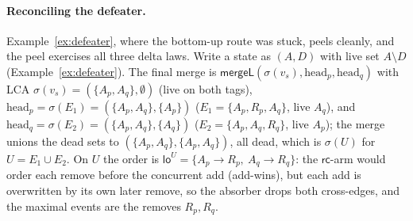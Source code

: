 \documentclass[11pt]{article}
\newcommand{\rcrel}{\mathsf{rc}}                 %
\newcommand{\mergeL}{\mathsf{mergeL}}
\newcommand{\loE}[1]{\mathsf{lo}^{#1}}
\begin{document}
\paragraph{Reconciling the defeater.} Example~\ref{ex:defeater}, where the
bottom-up route was stuck, peels cleanly, and the peel exercises all three
delta laws. Write a state as $(A, D)$ with live set $A \setminus D$
(Example~\ref{ex:defeater}). The final merge is
$\mergeL(\sigma(v_s), \mathrm{head}_p, \mathrm{head}_q)$ with LCA
$\sigma(v_s) = (\{A_p, A_q\}, \emptyset)$ (live on both tags),
$\mathrm{head}_p = \sigma(E_1) = (\{A_p, A_q\}, \{A_p\})$
($E_1 = \{A_p, R_p, A_q\}$, live $A_q$), and
$\mathrm{head}_q = \sigma(E_2) = (\{A_p, A_q\}, \{A_q\})$
($E_2 = \{A_p, A_q, R_q\}$, live $A_p$); the merge unions the dead sets to
$(\{A_p, A_q\}, \{A_p, A_q\})$, all dead, which is $\sigma(U)$ for
$U = E_1 \cup E_2$. On $U$ the order is
$\loE{U} = \{A_p \!\to\! R_p,\ A_q \!\to\! R_q\}$: the $\rcrel$-arm would order
each remove before the concurrent add (add-wins), but each add is overwritten
by its own later remove, so the absorber drops both cross-edges, and the
maximal events are the removes $R_p, R_q$.
\end{document}
